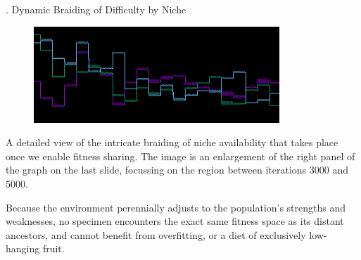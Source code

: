 \documentclass[9pt]{beamer}
\begin{document}
\begin{frame}{\theframenumber. Dynamic Braiding of Difficulty by Niche}
  \begin{figure}
    \includegraphics[width=\textwidth]{../images/braiding.png}
  \end{figure}
  A detailed view of the intricate braiding of niche availability that takes place once we enable fitness sharing. The image is an enlargement of the right panel of the graph on the last slide, focussing on the region between iterations 3000 and 5000.
\vspace{8pt}

  Because the environment perennially adjusts to the population's strengths and weaknesses, no specimen encounters the exact same fitness space as its distant ancestors, and cannot benefit from overfitting, or a diet of exclusively low-hanging fruit.
\end{frame}
\end{document}
